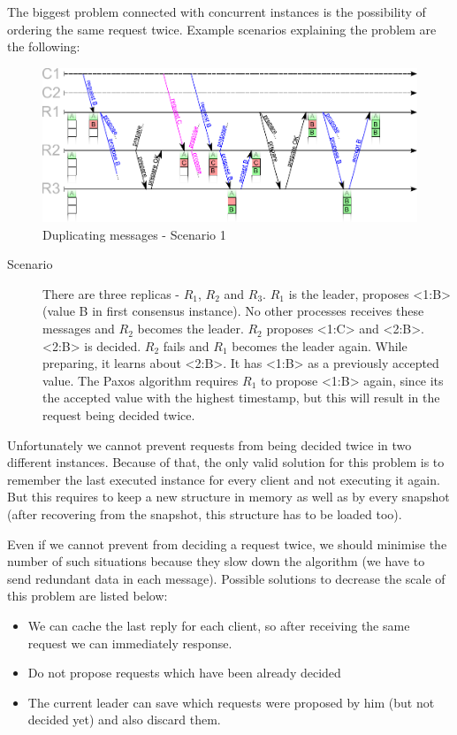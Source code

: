 The biggest problem connected with concurrent instances is the possibility of ordering the same request twice. Example scenarios explaining the problem are the following:
\begin{figure}[ht]
  \includegraphics[keepaspectratio, width=\textwidth]{paxos/duplicating_messages.pdf}
  \caption{Duplicating messages - Scenario 1}
\end{figure}
\begin{description}
  \item [Scenario] There are three replicas - $R_1$, $R_2$ and $R_3$. $R_1$ is the leader, proposes <1:B> (value B in first consensus instance). No other processes receives these messages and $R_2$ becomes the leader. $R_2$ proposes <1:C> and <2:B>. <2:B> is decided. $R_2$ fails and $R_1$ becomes the leader again. While preparing, it learns about <2:B>. It has <1:B> as a previously accepted value. The Paxos algorithm requires $R_1$ to propose <1:B> again, since its the accepted value with the highest timestamp, but this will result in the request being decided twice.
\end{description} 

Unfortunately we cannot prevent requests from being decided twice in two different instances. Because of that, the only valid solution for this problem is to remember the last executed instance for every client and not executing it again. But this requires to keep a new structure in memory as well as by every snapshot (after recovering from the snapshot, this structure has to be loaded too).

Even if we cannot prevent from deciding a request twice, we should minimise the number of such situations because they slow down the algorithm (we have to send redundant data in each message). Possible solutions to decrease the scale of this problem are listed below:
\begin{itemize}
  \item We can cache the last reply for each client, so after receiving the same request we can immediately response.
  \item Do not propose requests which have been already decided
  \item The current leader can save which requests were proposed by him (but not decided yet) and also discard them.
\end{itemize}


